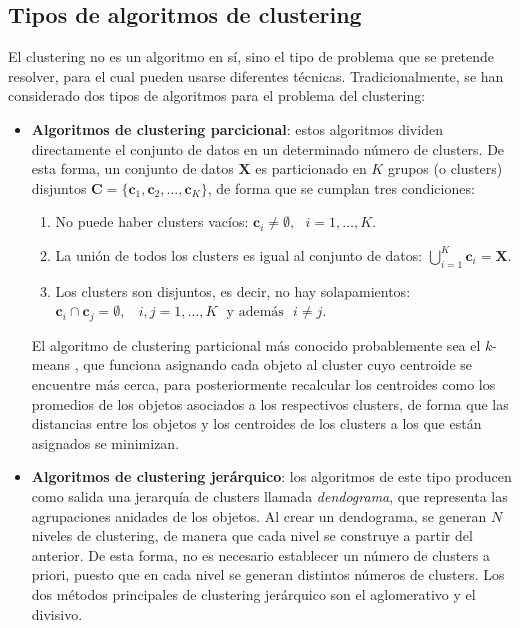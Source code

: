 \subsection{Tipos de algoritmos de clustering}

El clustering no es un algoritmo en sí, sino el tipo de problema que se pretende resolver, para el cual pueden usarse diferentes técnicas. Tradicionalmente, se han considerado dos tipos de algoritmos para el problema del clustering:

\begin{itemize}
	\item \textbf{Algoritmos de clustering parcicional}: estos algoritmos dividen directamente el conjunto de datos en un determinado número de clusters. De esta forma, un conjunto de datos $\textbf{X}$ es particionado en $K$ grupos (o clusters) disjuntos $\textbf{C} = \{ \textbf{c}_{1},\textbf{c}_{2},\dots,\textbf{c}_{K}\}$, de forma que se cumplan tres condiciones:
	\begin{enumerate}
		\item No puede haber clusters vacíos: $\textbf{c}_i \neq \emptyset,~~~i=1,\dots,K$.
		\item La unión de todos los clusters es igual al conjunto de datos: $\bigcup_{i=1}^{K}\textbf{c}_i =  \textbf{X}$.
		\item Los clusters son disjuntos, es decir, no hay solapamientos: $\textbf{c}_i \cap \textbf{c}_j = \emptyset,~~~~i,j=1,\dots,K~~~ \text{y además} ~~~i \neq j$.
		
		
	\end{enumerate}
	
	El algoritmo de clustering particional más conocido probablemente sea el $k$-means \cite{macqueen1967some}, que funciona asignando cada objeto al cluster cuyo centroide se encuentre más cerca, para posteriormente recalcular los centroides como los promedios de los objetos asociados a los respectivos clusters, de forma que las distancias entre los objetos y los centroides de los clusters a los que están asignados se minimizan.
	
	\item \textbf{Algoritmos de clustering jerárquico}: los algoritmos de este tipo producen como salida una jerarquía de clusters llamada \emph{dendograma}, que representa las agrupaciones anidades de los objetos. Al crear un dendograma, se generan $N$ niveles de clustering, de manera que cada nivel se construye a partir del anterior. De esta forma, no es necesario establecer un número de clusters a priori, puesto que en cada nivel se generan distintos números de clusters. Los dos métodos principales de clustering jerárquico son el aglomerativo y el divisivo.
\end{itemize}




